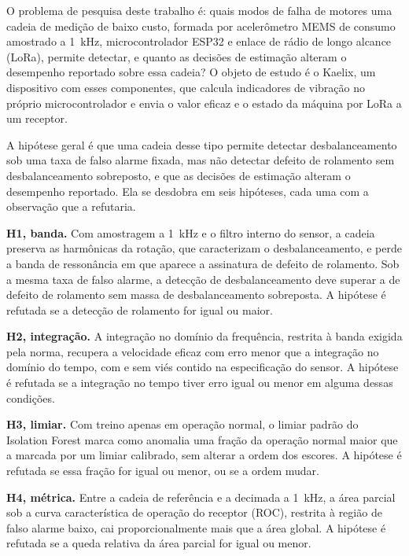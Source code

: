 O problema de pesquisa deste trabalho é: quais modos de falha de motores uma cadeia de
medição de baixo custo, formada por acelerômetro MEMS de consumo amostrado a
\SI{1}{\kilo\hertz}, microcontrolador ESP32 e enlace de rádio de longo alcance (LoRa),
permite detectar, e quanto as decisões de estimação alteram o desempenho reportado sobre
essa cadeia? O objeto de estudo é o Kaelix, um dispositivo com esses componentes, que
calcula indicadores de vibração no próprio microcontrolador e envia o valor eficaz e o estado
da máquina por LoRa a um receptor.

A hipótese geral é que uma cadeia desse tipo permite detectar desbalanceamento sob uma taxa
de falso alarme fixada, mas não detectar defeito de rolamento sem desbalanceamento
sobreposto, e que as decisões de estimação alteram o desempenho reportado. Ela se desdobra em seis hipóteses, cada uma com a observação que a refutaria.

\textbf{H1, banda.} Com amostragem a \SI{1}{\kilo\hertz} e o filtro interno do sensor, a
        cadeia preserva as harmônicas da rotação, que caracterizam o desbalanceamento, e
        perde a banda de ressonância em que aparece a assinatura de defeito de rolamento.
        Sob a mesma taxa de falso alarme, a detecção de desbalanceamento deve superar a de
        defeito de rolamento sem massa de desbalanceamento sobreposta. A hipótese é
        refutada se a detecção de rolamento for igual ou maior.

\textbf{H2, integração.} A integração no domínio da frequência, restrita à banda exigida
        pela norma, recupera a velocidade eficaz com erro menor que a integração no
        domínio do tempo, com e sem viés contido na especificação do sensor. A hipótese é
        refutada se a integração no tempo tiver erro igual ou menor em alguma dessas
        condições.

\textbf{H3, limiar.} Com treino apenas em operação normal, o limiar padrão do Isolation
        Forest marca como anomalia uma fração da operação normal maior que a marcada por
        um limiar calibrado, sem alterar a ordem dos escores. A hipótese é refutada se
        essa fração for igual ou menor, ou se a ordem mudar.

\textbf{H4, métrica.} Entre a cadeia de referência e a decimada a \SI{1}{\kilo\hertz}, a área parcial sob
        a curva característica de operação do receptor (ROC), restrita à região de falso
        alarme baixo, cai proporcionalmente mais que a área global. A hipótese é refutada
        se a queda relativa da área parcial for igual ou menor.

